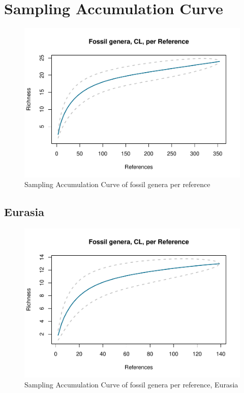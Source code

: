 \documentclass[]{article}
\begin{document}
\newpage

\section{Sampling Accumulation Curve}\label{sampling-accumulation-curve}

\begin{figure}[htbp]
\centering
\includegraphics{MA_JJ_files/figure-latex/Species Accumulation Curve with Genera-1.pdf}
\caption{Sampling Accumulation Curve of fossil genera per reference}
\end{figure}

\subsection{Eurasia}\label{eurasia}

\begin{figure}[htbp]
\centering
\includegraphics{MA_JJ_files/figure-latex/Species Accumulation Curve with Genera, Eurasia-1.pdf}
\caption{Sampling Accumulation Curve of fossil genera per reference,
Eurasia}
\end{figure}
\end{document}
